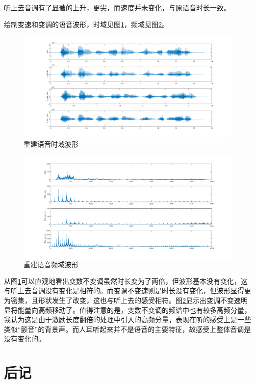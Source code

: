 \documentclass[10pt, a4paper]{article}
\begin{document}
听上去音调有了显著的上升，更尖，而速度并未变化，与原语音时长一致。

绘制变速和变调的语音波形，时域见图\ref{fig:4_2_time}，频域见图\ref{fig:4_2_freq}。

\begin{figure}[!ht]
    \centering
    \includegraphics[width=.8\textwidth]{../assets/4_2_time.png}
    \caption{重建语音时域波形}
    \label{fig:4_2_time}
\end{figure}

\begin{figure}[!ht]
    \centering
    \includegraphics[width=.8\textwidth]{../assets/4_2_freq.png}
    \caption{重建语音频域波形}
    \label{fig:4_2_freq}
\end{figure}

从图\ref{fig:4_2_time}可以直观地看出变数不变调虽然时长变为了两倍，但波形基本没有变化，这与听上去音调没有变化是相符的。而变调不变速则是时长没有变化，但波形显得更为密集，且形状发生了改变，这也与听上去的感受相符。图\ref{fig:4_2_freq}显示出变调不变速明显将能量向高频移动了。值得注意的是，变数不变调的频谱中也有较多高频分量，我认为这是由于激励长度翻倍的处理中引入的高频分量，表现在听的感受上是一些类似“颤音”的背景声。而人耳听起来并不是语音的主要特征，故感受上整体音调是没有变化的。

\section{后记}
\end{document}

